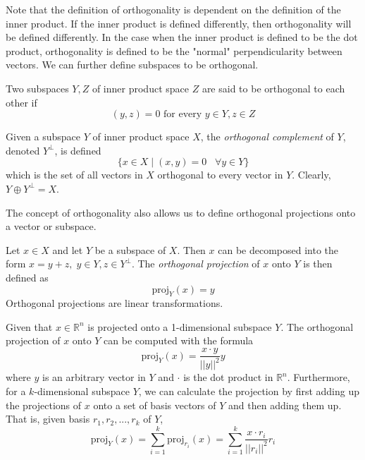 \documentclass{article}
\begin{document}
  Note that the definition of orthogonality is dependent on the definition of the inner product. If the inner product is defined differently, then orthogonality will be defined differently. In the case when the inner product is defined to be the dot product, orthogonality is defined to be the "normal" perpendicularity between vectors. We can further define subspaces to be orthogonal. 

  \begin{definition}
    Two subspaces $Y, Z$ of inner product space $Z$ are said to be orthogonal to each other if 
    \begin{equation}
      (y, z) = 0 \text{   for every } y \in Y, z \in Z
    \end{equation}
  \end{definition}

  \begin{definition}
    Given a subspace $Y$ of inner product space $X$, the \textit{orthogonal complement} of $Y$, denoted $Y^\perp$, is defined
    \begin{equation}
      \{ x \in X \; | \; (x, y) = 0 \;\;\; \forall y \in Y\}
    \end{equation}
    which is the set of all vectors in $X$ orthogonal to every vector in $Y$. Clearly, $Y \oplus Y^\perp = X$. 
  \end{definition}

  The concept of orthogonality also allows us to define orthogonal projections onto a vector or subspace. 

  \begin{definition}
    Let $x \in X$ and let $Y$ be a subspace of $X$. Then $x$ can be decomposed into the form $x = y + z, \; y \in Y, z \in Y^\perp$. The \textit{orthogonal projection} of $x$ onto $Y$ is then defined as 
    \begin{equation}
      \text{proj}_Y (x) = y
    \end{equation}
    Orthogonal projections are linear transformations. 
  \end{definition}

  \begin{proposition}
    Given that $x \in \mathbb{R}^n$ is projected onto a 1-dimensional subspace $Y$. The orthogonal projection of $x$ onto $Y$ can be computed with the formula 
    \begin{equation}
      \text{proj}_Y (x) = \frac{x \cdot y}{||y||^2} y
    \end{equation}
    where $y$ is an arbitrary vector in $Y$ and $\cdot$ is the dot product in $\mathbb{R}^n$. Furthermore, for a $k$-dimensional subspace $Y$, we can calculate the projection by first adding up the projections of $x$ onto a set of basis vectors of $Y$ and then adding them up. That is, given basis $r_1, r_2, ..., r_k$ of $Y$,
    \begin{equation}
        \text{proj}_Y (x) = \sum_{i=1}^k \text{proj}_{r_i} (x) = \sum_{i=1}^k \frac{x \cdot r_i}{||r_i||^2} r_i 
    \end{equation}
  \end{proposition}
\end{document}
